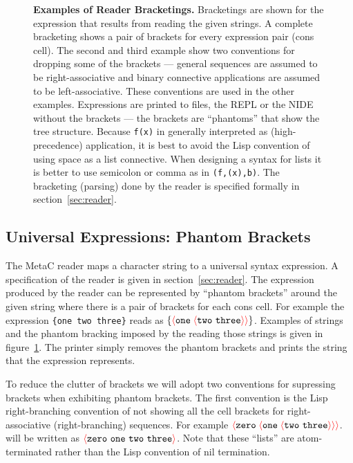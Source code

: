 \documentclass{article}
\newcommand{\mtt}[1]{\mbox{\tt #1}}
\newcommand{\fopen}{{\color{red} \langle}}
\newcommand{\fclose}{{\color{red} \rangle}}
\begin{document}
\begin{figure}
\caption{{\bf Examples of Reader Bracketings.} Bracketings are shown for the expression that results from reading the given strings.
  A complete bracketing shows a pair of brackets for every expression
  pair (cons cell).  The second and third example show two conventions
  for dropping some of the brackets --- general sequences are assumed
  to be right-associative and binary connective applications are
  assumed to be left-associative.  These conventions are used in the
  other examples.  Expressions are printed to files, the REPL or the NIDE without the brackets ---
  the brackets are ``phantoms'' that show the tree structure.  Because {\tt f(x)} in generally interpreted as (high-precedence) application,
  it is best to avoid the Lisp convention of using space as a list connective.
  When designing a syntax for lists it is better to use semicolon or comma
  as in {\tt (f,(x),b)}. The
  bracketing (parsing) done by the reader is specified formally in
  section~\ref{sec:reader}.}
\label{fig:reader}
\end{figure}

\subsection{Universal Expressions: Phantom Brackets}

The MetaC reader maps a character string to a universal syntax expression.  A specification of the reader is given in section~\ref{sec:reader}.
The expression produced by the reader
can be represented by ``phantom brackets'' around the given string
where there is a pair of brackets for each cons cell.
For example the expression \mtt{\{one two three\}} reads as $\{\fopen \mathtt{one}\;\fopen \mathtt{two~three}\fclose \fclose\}$.
Examples of strings and the phantom bracking imposed by the reading those strings is given in figure~{\ref{fig:reader}}.
The printer simply removes the phantom brackets and prints the string that the expression represents.

To reduce the clutter of brackets we will adopt two conventions for supressing brackets when exhibiting phantom brackets.
The first convention is the Lisp right-branching convention of not showing all the cell brackets for right-associative (right-branching) sequences.
For example $\fopen \mathtt{zero}\;\fopen \mathtt{one}\;\fopen \mathtt{two~three}\fclose \fclose \fclose$.
will be written as $\fopen\mathtt{zero~one~two~three}\fclose$.  Note that these ``lists'' are atom-terminated rather than the Lisp convention of
nil termination.
\end{document}
